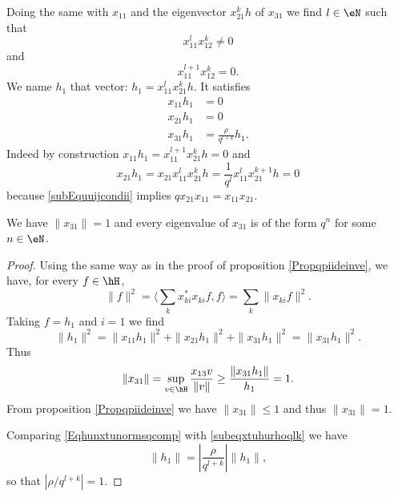 Doing the same with \( x_{11}\) and the eigenvector \( x_{21}^kh\) of \( x_{31}\) we find \( l\in\eN\) such that
\begin{equation}
    x_{11}^lx_{12}^k\neq 0
\end{equation}
and 
\begin{equation}
    x_{11}^{l+1}x_{12}^k=0.
\end{equation}
We name \( h_1\) that vector: $h_1=x_{11}^lx_{21}^kh$. It satisfies
\begin{subequations}
    \begin{align}
        x_{11}h_1&=0\\
        x_{21}h_1&=0\\
        x_{31}h_1&=\frac{ \rho }{ q^{l+k} }h_1      \label{subeqxtuhurhoqlk}.
    \end{align}
\end{subequations}
Indeed by construction \( x_{11}h_1=x_{11}^{l+1}x_{21}^kh=0\) and
\begin{equation}
    x_{21}h_1=x_{21}x_{11}^{l}x_{21}^kh=\frac{1}{ q^l }x_{11}^lx_{21}^{k+1}h=0
\end{equation}
because \eqref{subEquuijcondii} implies \( qx_{21}x_{11}=x_{11}x_{21}\).

\begin{proposition}
    We have \( \| x_{31} \|=1\) and every eigenvalue of \( x_{31}\) is of the form \( q^n\) for some \( n\in\eN\).
\end{proposition}

\begin{proof}
    Using the same way as in the proof of proposition \ref{Propqpiideinve}, we have, for every \( f\in\hH\), 
    \begin{equation}
        \| f \|^2=\langle \sum_kx_{ki}^*x_{ki}f, f\rangle=\sum_k\| x_{ki}f \|^2.
    \end{equation}
    Taking \( f=h_1\) and \( i=1\) we find
    \begin{equation}    \label{Eqhunxtunormsqcomp}
        \| h_1 \|^2=\| x_{11}h_1 \|^2+\| x_{21}h_1 \|^2+\| x_{31}h_1 \|^2=\| x_{31}h_1 \|^2.
    \end{equation}
    Thus
    \begin{equation}
        \| x_{31} \|=\sup_{v\in\hH}\frac{ x_{13}v }{ \| v \| }\geq\frac{ \| x_{31}h_1 \| }{ h_1 }=1.
    \end{equation}
    From proposition \ref{Propqpiideinve} we have \( \| x_{31} \|\leq 1\) and thus \( \| x_{31} \|=1\).

    Comparing \eqref{Eqhunxtunormsqcomp} with \eqref{subeqxtuhurhoqlk} we have
    \begin{equation}
        \| h_1 \|=\left| \frac{ \rho }{ q^{l+k} } \right| \| h_1 \|,
    \end{equation}
    so that \( | \rho/q^{l+k} |=1\).
\end{proof}

